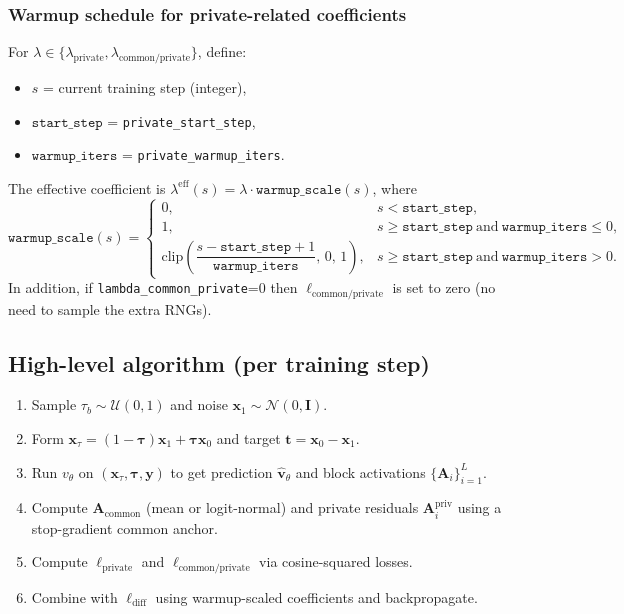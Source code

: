 \documentclass[11pt]{article}
\begin{document}
\subsubsection*{Warmup schedule for private-related coefficients}
For $\lambda\in\{\lambda_{\text{private}},\lambda_{\text{common/private}}\}$, define:
\begin{itemize}
  \item $s$ = current training step (integer),
  \item $\texttt{start\_step}$ = \texttt{private\_start\_step},
  \item $\texttt{warmup\_iters}$ = \texttt{private\_warmup\_iters}.
\end{itemize}
The effective coefficient is $\lambda^{\text{eff}}(s)=\lambda\cdot \texttt{warmup\_scale}(s)$, where
\[
  \texttt{warmup\_scale}(s)=
  \begin{cases}
    0, & s<\texttt{start\_step},\\[4pt]
    1, & s\ge \texttt{start\_step}\ \text{and}\ \texttt{warmup\_iters}\le 0,\\[4pt]
    \mathrm{clip}\!\left(\dfrac{s-\texttt{start\_step}+1}{\texttt{warmup\_iters}},\,0,\,1\right),
      & s\ge \texttt{start\_step}\ \text{and}\ \texttt{warmup\_iters}>0.
  \end{cases}
 \]
In addition, if \texttt{lambda\_common\_private}=0 then $\ell_{\text{common/private}}$ is set to zero (no need to sample the extra RNGs).

\subsection*{High-level algorithm (per training step)}
\begin{enumerate}
  \item Sample $\tau_b\sim\mathcal{U}(0,1)$ and noise $\bm{x}_1\sim\mathcal{N}(0,\bm{I})$.
  \item Form $\bm{x}_\tau=(1-\bm{\tau})\bm{x}_1+\bm{\tau}\bm{x}_0$ and target $\bm{t}=\bm{x}_0-\bm{x}_1$.
  \item Run $v_\theta$ on $(\bm{x}_\tau,\bm{\tau},\bm{y})$ to get prediction $\hat{\bm{v}}_\theta$ and block activations $\{\bm{A}_i\}_{i=1}^L$.
  \item Compute $\bm{A}_{\text{common}}$ (mean or logit-normal) and private residuals $\bm{A}_i^{\text{priv}}$ using a stop-gradient common anchor.
  \item Compute $\ell_{\text{private}}$ and $\ell_{\text{common/private}}$ via cosine-squared losses.
  \item Combine with $\ell_{\text{diff}}$ using warmup-scaled coefficients and backpropagate.
\end{enumerate}
\end{document}
